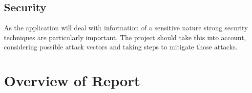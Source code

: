 \subsection{Security}
As the application will deal with information of a sensitive nature strong security techniques are particularly important.
The project should take this into account, considering possible attack vectors and taking steps to mitigate those attacks.

\section{Overview of Report}
